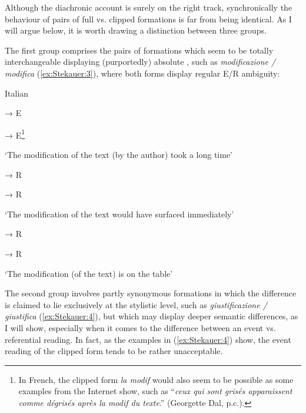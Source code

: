 \documentclass[output=paper]{langsci/langscibook}
\begin{document}
Although the diachronic account is surely on the right track,
synchronically the behaviour of pairs of full vs. clipped formations is
far from being identical. As I will argue below, it is worth drawing a
distinction between three groups.

The first group comprises the pairs of formations which seem to be
totally interchangeable displaying (purportedly) absolute , such
as \emph{modificazione / modifica} (\ref{ex:Stekauer:3}), where both forms display
regular E/R ambiguity:

\begin{exe}
\ex\label{ex:Stekauer:3} Italian
\begin{xlist}
 → E

 → E\footnote{In French, the clipped form \emph{la modif} would
  also seem to be possible as some examples from the Internet show, such
  as ``\emph{ceux qui sont grisés apparaissent comme dégrisés après la
  modif du texte}.'' (Georgette Dal, p.c.).}

\trans `The modification of the text (by the author) took a long time'

 → R

 → R

\trans `The modification of the text would have surfaced immediately'

 → R

 → R

\trans `The modification (of the text) is on the table'
\end{xlist}
\end{exe}


The second group involves partly synonymous formations in which the
difference is claimed to lie exclusively at the stylistic level, such as
\emph{giustificazione / giustifica} (\ref{ex:Stekauer:4}), but which may display deeper semantic differences, as I will show, especially when it comes to the
difference between an event vs. referential reading. In fact, as the
examples in (\ref{ex:Stekauer:4}) show, the event reading of the clipped form tends to be
rather unacceptable.
\end{document}
